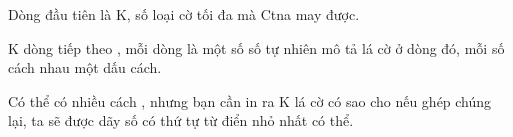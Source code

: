 Dòng đầu tiên là K, số loại cờ tối đa mà Ctna may được.

K dòng tiếp theo , mỗi dòng là một số số tự nhiên mô tả lá cờ ở dòng đó, mỗi số cách nhau một dấu cách.

Có thể có nhiều cách , nhưng bạn cần in ra K lá cờ có sao cho nếu ghép chúng lại, ta sẽ được dãy số có thứ tự từ điển nhỏ nhất có thể.

\